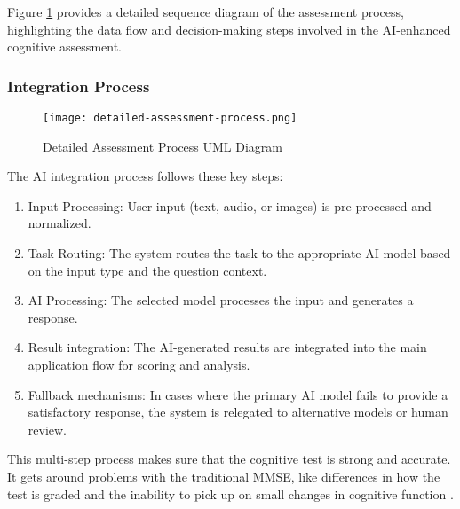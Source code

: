 Figure \ref{fig:detailed-assessment-process} provides a detailed sequence diagram of the assessment process, highlighting the data flow and decision-making steps involved in the AI-enhanced cognitive assessment.

\subsubsection{Integration Process}
\begin{figure}[h!]
\begin{center}
\texttt{[image: detailed-assessment-process.png]}
\caption{Detailed Assessment Process UML Diagram}
\label{fig:detailed-assessment-process}
\end{center}
\end{figure}

The AI integration process follows these key steps:
\begin{enumerate}
\item Input Processing: User input (text, audio, or images) is pre-processed and normalized.
\item Task Routing: The system routes the task to the appropriate AI model based on the input type and the question context.
\item AI Processing: The selected model processes the input and generates a response.
\item Result integration: The AI-generated results are integrated into the main application flow for scoring and analysis.
\item Fallback mechanisms: In cases where the primary AI model fails to provide a satisfactory response, the system is relegated to alternative models or human review.
\end{enumerate}

This multi-step process makes sure that the cognitive test is strong and accurate. It gets around problems with the traditional MMSE, like differences in how the test is graded and the inability to pick up on small changes in cognitive function \cite{Tombaugh1992}.

